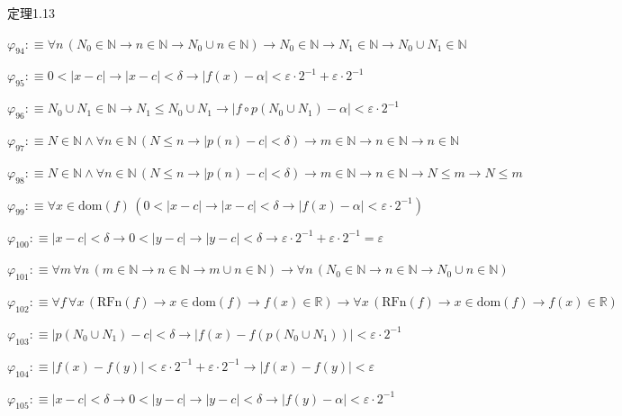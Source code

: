 \begin{fullproof}{定理1.13}
\begin{abbrevlist}
\item $\varphi_{94} :\equiv \forall n\,(N_{0} \in \mathbb{N} \to n \in \mathbb{N} \to N_{0} \cup n \in \mathbb{N}) \to N_{0} \in \mathbb{N} \to N_{1} \in \mathbb{N} \to N_{0} \cup N_{1} \in \mathbb{N}$
\item $\varphi_{95} :\equiv 0 < \lvert x - c \rvert \to \lvert x - c \rvert < \delta \to \lvert f(x) - \alpha \rvert < \varepsilon \cdot 2^{-1} + \varepsilon \cdot 2^{-1}$
\item $\varphi_{96} :\equiv N_{0} \cup N_{1} \in \mathbb{N} \to N_{1} \leq N_{0} \cup N_{1} \to \lvert f \circ p(N_{0} \cup N_{1}) - \alpha \rvert < \varepsilon \cdot 2^{-1}$
\item $\varphi_{97} :\equiv N \in \mathbb{N} \land \forall n \in \mathbb{N}\,(N \leq n \to \lvert p(n) - c \rvert < \delta) \to m \in \mathbb{N} \to n \in \mathbb{N} \to n \in \mathbb{N}$
\item $\varphi_{98} :\equiv N \in \mathbb{N} \land \forall n \in \mathbb{N}\,(N \leq n \to \lvert p(n) - c \rvert < \delta) \to m \in \mathbb{N} \to n \in \mathbb{N} \to N \leq m \to N \leq m$
\item $\varphi_{99} :\equiv \forall x \in \mathrm{dom}(f)\,(0 < \lvert x - c \rvert \to \lvert x - c \rvert < \delta \to \lvert f(x) - \alpha \rvert < \varepsilon \cdot 2^{-1})$
\item $\varphi_{100} :\equiv \lvert x - c \rvert < \delta \to 0 < \lvert y - c \rvert \to \lvert y - c \rvert < \delta \to \varepsilon \cdot 2^{-1} + \varepsilon \cdot 2^{-1} = \varepsilon$
\item $\varphi_{101} :\equiv \forall m\,\forall n\,(m \in \mathbb{N} \to n \in \mathbb{N} \to m \cup n \in \mathbb{N}) \to \forall n\,(N_{0} \in \mathbb{N} \to n \in \mathbb{N} \to N_{0} \cup n \in \mathbb{N})$
\item $\varphi_{102} :\equiv \forall f\,\forall x\,(\mathrm{RFn}(f) \to x \in \mathrm{dom}(f) \to f(x) \in \mathbb{R}) \to \forall x\,(\mathrm{RFn}(f) \to x \in \mathrm{dom}(f) \to f(x) \in \mathbb{R})$
\item $\varphi_{103} :\equiv \lvert p(N_{0} \cup N_{1}) - c \rvert < \delta \to \lvert f(x) - f(p(N_{0} \cup N_{1})) \rvert < \varepsilon \cdot 2^{-1}$
\item $\varphi_{104} :\equiv \lvert f(x) - f(y) \rvert < \varepsilon \cdot 2^{-1} + \varepsilon \cdot 2^{-1} \to \lvert f(x) - f(y) \rvert < \varepsilon$
\item $\varphi_{105} :\equiv \lvert x - c \rvert < \delta \to 0 < \lvert y - c \rvert \to \lvert y - c \rvert < \delta \to \lvert f(y) - \alpha \rvert < \varepsilon \cdot 2^{-1}$

\end{abbrevlist}
\end{fullproof}
